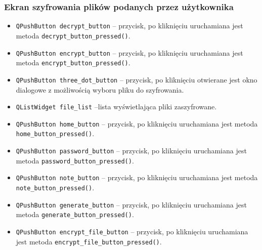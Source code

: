 \documentclass[a4paper]{article}
\newcommand{\prog}{\texttt}
\begin{document}
\subsubsection{Ekran szyfrowania plików podanych przez użytkownika}
\begin{itemize}
    \item \prog{QPushButton decrypt\_button} -- przycisk, po kliknięciu uruchamiana jest metoda \prog{decrypt\_button\_pressed()}.
    \item \prog{QPushButton encrypt\_button} -- przycisk, po kliknięciu uruchamiana jest metoda \prog{encrypt\_button\_pressed()}.
    \item \prog{QPushButton three\_dot\_button} -- przycisk, po kliknięciu otwierane jest okno dialogowe z możliwością wyboru pliku do szyfrowania.
    \item \prog{QListWidget file\_list} --lista wyświetlająca pliki zaszyfrowane.
    \item \prog{QPushButton home\_button} -- przycisk, po kliknięciu uruchamiana jest metoda \prog{home\_button\_pressed()}.
    \item \prog{QPushButton password\_button} -- przycisk, po kliknięciu uruchamiana jest metoda \prog{password\_button\_pressed()}.
    \item \prog{QPushButton note\_button} -- przycisk, po kliknięciu uruchamiana jest metoda \prog{note\_button\_pressed()}.
    \item \prog{QPushButton generate\_button} -- przycisk, po kliknięciu uruchamiana jest metoda \prog{generate\_button\_pressed()}.
    \item \prog{QPushButton encrypt\_file\_button} -- przycisk, po kliknięciu uruchamiana jest metoda \prog{encrypt\_file\_button\_pressed()}.
\end{itemize}
\end{document}
